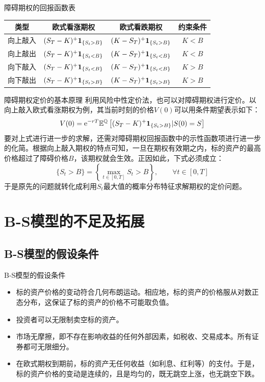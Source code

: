\documentclass[t]{beamer}
\newcommand{\EQ}{\mathbb{E}^{\mathbb{Q}}}
\begin{document}
\begin{frame}{障碍期权的回报函数表}
	\centering
	\begin{tabular}{cccc}
		\hline
		类型  & 欧式看涨期权  & 欧式看跌期权 & 约束条件\\
		\hline 
		向上敲入 & $(S_T-K)^+{\bf 1}_{\{S_t>B\}}$ & $(K-S_T)^+{\bf 1}_{\{S_t>B\}}$ &  $K<B$     \\
		向上敲出& $(S_T-K)^+{\bf 1}_{\{S_t<B\}}$ & $(K-S_T)^+{\bf 1}_{\{S_t<B\}}$   &  $K<B$    \\
		向下敲入& $(S_T-K)^+{\bf 1}_{\{S_t<B\}}$ & $(K-S_T)^+{\bf 1}_{\{S_t<B\}}$ &  $K>B$     \\
		向下敲出& $(S_T-K)^+{\bf 1}_{\{S_t>B\}}$ & $(K-S_T)^+{\bf 1}_{\{S_t>B\}}$ &  $K>B$     \\
		\hline
		\end{tabular}
\end{frame}


\begin{frame}{障碍期权定价的基本原理}
	利用风险中性定价法，也可以对障碍期权进行定价。以向上敲入欧式看涨期权为例，其当前时刻的价格$V(0)$可以用条件期望表示如下：
\[V(0)={\rm e}^{-rT}\EQ\left[(S_T-K)^+{\bf 1}_{\{S_t>B\}}|S(0)=S\right] \]
要对上式进行进一步的求解，还需对障碍期权回报函数中的示性函数项进行进一步的化简。根据向上敲入期权的特点可知，一旦在期权有效期之内，标的资产的最高价格超过了障碍价格$B$，该期权就会生效。正因如此，下式必须成立：
\[\{S_t>B\}=\left\{\max_{t\in[0,T]}S_t>B\right\},\qquad \forall t\in[0,T]\]
于是原先的问题就转化成利用$S_t$最大值的概率分布特征求解期权的定价问题。
\end{frame}


\section{B-S模型的不足及拓展}

\subsection{B-S模型的假设条件}

\begin{frame}{B-S模型的假设条件}
	\begin{itemize}
		\item 标的资产价格的变动符合几何布朗运动。相应地，标的资产的价格服从对数正态分布，这保证了标的资产的价格不可能取负值。
		\item 投资者可以无限制卖空标的资产。
		\item 		市场无摩擦，即不存在影响收益的任何外部因素，如税收、交易成本。所有证券都可无限细分。
		\item 		在欧式期权到期前，标的资产无任何收益（如利息、红利等）的支付。于是，标的资产价格的变动是连续的，且是均匀的，既无跳空上涨，也无跳空下跌。
	\end{itemize}
\end{frame}
\end{document}
